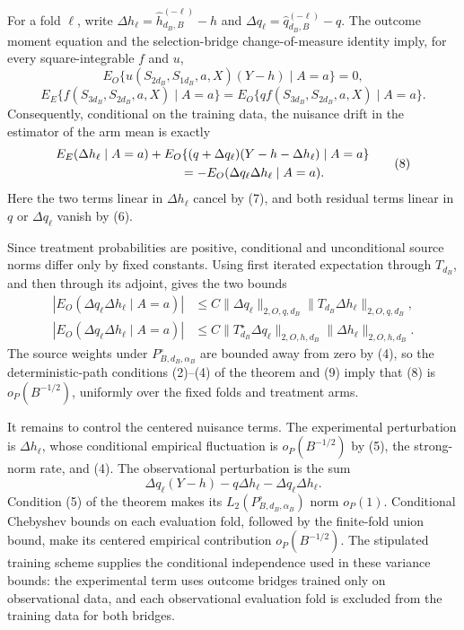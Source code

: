 For a fold \(\ell\), write \(\Delta h_\ell=\widehat h_{d_B,B}^{(-\ell)}-h\) and \(\Delta q_\ell=\widehat q_{d_B,B}^{(-\ell)}-q\).  The outcome moment equation and the selection-bridge change-of-measure identity imply, for every square-integrable \(f\) and \(u\),
\[
 E_O\{u(S_{2d_B},S_{1d_B},a,X)(Y-h)\mid A=a\}=0,
 \tag{6}
\]
\[
 E_E\{f(S_{3d_B},S_{2d_B},a,X)\mid A=a\}
 =E_O\{q f(S_{3d_B},S_{2d_B},a,X)\mid A=a\}.
 \tag{7}
\]
Consequently, conditional on the training data, the nuisance drift in the estimator of the arm mean is exactly
\[
\begin{aligned}
 &E_E(\Delta h_\ell\mid A=a)
 +E_O\{(q+\Delta q_\ell)(Y-h-\Delta h_\ell)\mid A=a\}\\
 &\hspace{35mm}=-E_O(\Delta q_\ell\Delta h_\ell\mid A=a).
\end{aligned}
 \tag{8}
\]
Here the two terms linear in \(\Delta h_\ell\) cancel by (7), and both residual terms linear in \(q\) or \(\Delta q_\ell\) vanish by (6).

Since treatment probabilities are positive, conditional and unconditional source norms differ only by fixed constants.  Using first iterated expectation through \(T_{d_B}\), and then through its adjoint, gives the two bounds
\[
\begin{aligned}
 |E_O(\Delta q_\ell\Delta h_\ell\mid A=a)|
 &\le C\|\Delta q_\ell\|_{2,O,q,d_B}
       \|T_{d_B}\Delta h_\ell\|_{2,O,q,d_B},\\
 |E_O(\Delta q_\ell\Delta h_\ell\mid A=a)|
 &\le C\|T_{d_B}^{\star}\Delta q_\ell\|_{2,O,h,d_B}
       \|\Delta h_\ell\|_{2,O,h,d_B}.
\end{aligned}
 \tag{9}
\]
The source weights under \(P_{B,d_B,\alpha_B}^{\circ}\) are bounded away from zero by (4), so the deterministic-path conditions (2)--(4) of the theorem and (9) imply that (8) is \(o_P(B^{-1/2})\), uniformly over the fixed folds and treatment arms.

It remains to control the centered nuisance terms.  The experimental perturbation is \(\Delta h_\ell\), whose conditional empirical fluctuation is \(o_P(B^{-1/2})\) by (5), the strong-norm rate, and (4).  The observational perturbation is the sum
\[
 \Delta q_\ell(Y-h)-q\Delta h_\ell-\Delta q_\ell\Delta h_\ell.
 \tag{10}
\]
Condition (5) of the theorem makes its \(L_2(P_{B,d_B,\alpha_B}^{\circ})\) norm \(o_P(1)\).  Conditional Chebyshev bounds on each evaluation fold, followed by the finite-fold union bound, make its centered empirical contribution \(o_P(B^{-1/2})\).  The stipulated training scheme supplies the conditional independence used in these variance bounds: the experimental term uses outcome bridges trained only on observational data, and each observational evaluation fold is excluded from the training data for both bridges.

